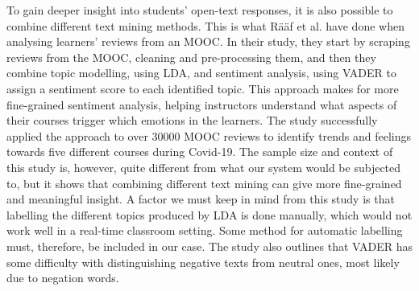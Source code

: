 To gain deeper insight into students' open-text responses, it is also possible to combine different text mining methods. This is what Rääf et al. \cite{raaf2021} have done when analysing learners' reviews from an MOOC. In their study, they start by scraping reviews from the MOOC, cleaning and pre-processing them, and then they combine topic modelling, using LDA, and sentiment analysis, using VADER to assign a sentiment score to each identified topic. This approach makes for more fine-grained sentiment analysis, helping instructors understand what aspects of their courses trigger which emotions in the learners. The study successfully applied the approach to over 30000 MOOC reviews to identify trends and feelings towards five different courses during Covid-19. The sample size and context of this study is, however, quite different from what our system would be subjected to, but it shows that combining different text mining can give more fine-grained and meaningful insight. A factor we must keep in mind from this study is that labelling the different topics produced by LDA is done manually, which would not work well in a real-time classroom setting. Some method for automatic labelling must, therefore, be included in our case. The study also outlines that VADER has some difficulty with distinguishing negative texts from neutral ones, most likely due to negation words.

